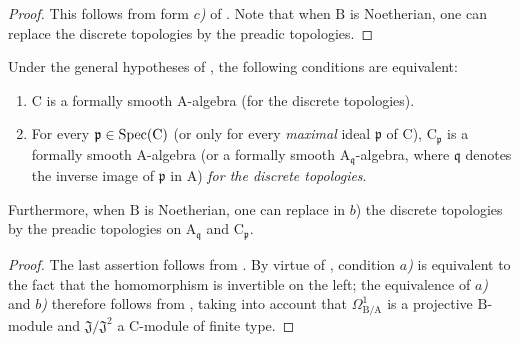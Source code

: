 \begin{proof}
This follows from form \emph{$c$)} of .
Note that when $\mathrm{B}$ is Noetherian, one can replace the discrete topologies by the preadic topologies.
\end{proof}

\begin{corollary}[22.6.6]
\label{0.22.6.6}
Under the general hypotheses of , the following conditions are equivalent:
\begin{enumerate}
  \item[\textup{a)}] $\mathrm{C}$ is a formally smooth $\mathrm{A}$-algebra (for the discrete topologies).
  \item[\textup{b)}] For every $\mathfrak{p}\in\operatorname{Spec}(\mathrm{C})$ \textup{(or only for every \emph{maximal} ideal $\mathfrak{p}$ of $\mathrm{C}$)}, $\mathrm{C}_\mathfrak{p}$ is a formally smooth $\mathrm{A}$-algebra \textup{(or a formally smooth $\mathrm{A}_{\mathfrak{q}}$-algebra, where $\mathfrak{q}$ denotes the inverse image of $\mathfrak{p}$ in $\mathrm{A}$)} \emph{for the discrete topologies}.
\end{enumerate}
Furthermore, when $\mathrm{B}$ is Noetherian, one can replace in \textup{$b$)} the discrete topologies by the preadic topologies on $\mathrm{A}_{\mathfrak{q}}$ and $\mathrm{C}_\mathfrak{p}$.
\end{corollary}

\begin{proof}
The last assertion follows from .
By virtue of , condition \emph{$a$)} is equivalent to the fact that
the homomorphism  is invertible on the left; the equivalence
of \emph{$a$)} and \emph{$b$)} therefore follows from , taking into account
that $\Omega^1_{\mathrm{B}/\mathrm{A}}$ is a projective $\mathrm{B}$-module
and $\mathfrak{J}/\mathfrak{J}^2$ a $\mathrm{C}$-module of finite type.
\end{proof}

